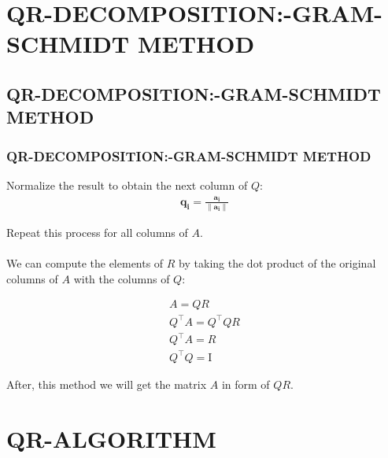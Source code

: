 \documentclass{beamer}
\theoremstyle{remark}
\providecommand{\norm}[1]{\lVert#1\rVert}
\let\vec\mathbf
\numberwithin{equation}{section}
\begin{document}
\section{QR-DECOMPOSITION:-GRAM-SCHMIDT METHOD}
\subsection{QR-DECOMPOSITION:-GRAM-SCHMIDT METHOD}
\begin{frame}
\frametitle{QR-DECOMPOSITION:-GRAM-SCHMIDT METHOD}

Normalize the result to obtain the next column of $ Q $:
\begin{align}
\vec{q_i} = \frac{\vec{a_i}}{\norm{\vec{a_i}}}
\end{align}

Repeat this process for all columns of $ A $.\\
\text{  }\\
We can compute the elements of $R$ by taking the dot product of the original columns of $A$ with the columns of $Q$:

\begin{align}
    A=QR\\
    Q^\top A = Q^\top QR \\
    Q^\top A = R \\  Q^\top Q = \text{I}
\end{align}

After, this method we will get the matrix $A$ in form of $QR$.
\end{frame}

\section{QR-ALGORITHM}
\end{document}
